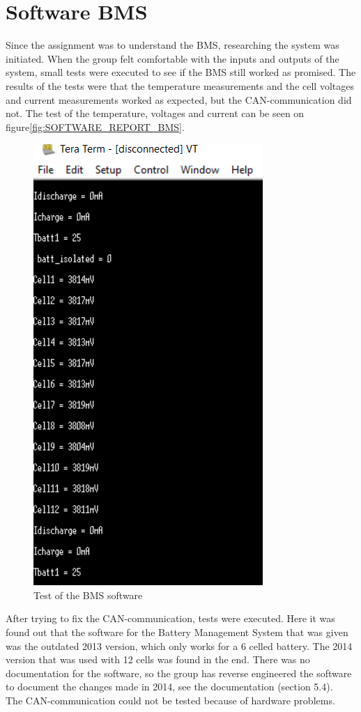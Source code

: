 \section{Software BMS}
Since the assignment was to understand the BMS, researching the system was initiated. When the group felt comfortable with the inputs and outputs of the system, small tests were executed to see if the BMS still worked as promised. The results of the tests were that the temperature measurements and the cell voltages and current measurements worked as expected, but the CAN-communication did not. The test of the temperature, voltages and current can be seen on figure\vref{fig:SOFTWARE_REPORT_BMS}.\\

\begin{figure}[H]
	\centering
	\includegraphics[width=0.45\linewidth]{SubPages/Images/BMS_teraterm_test.PNG}
	\caption{Test of the BMS software}
	\label{fig:SOFTWARE_REPORT_BMS}
\end{figure}

After trying to fix the CAN-communication, tests were executed. Here it was found out that the software for the Battery Management System that was given was the outdated 2013 version, which only works for a 6 celled battery. The 2014 version that was used with 12 cells was found in the end. There was no documentation for the software, so the group has reverse engineered the software to document the changes made in 2014, see the documentation\cite{AU2} (section 5.4).\\
The CAN-communication could not be tested because of hardware problems.


